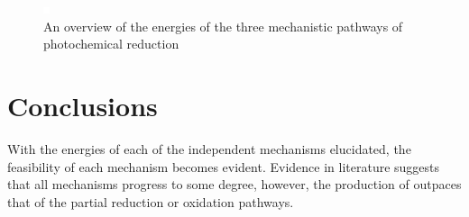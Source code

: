 \begin{figure}[!htbp]
 \begin{center}
  \includegraphics[clip=true]{images/insertgraphic.eps}
 \end{center}
\caption[Reaction energies for three mechanistic pathways]{An overview of the energies of the three mechanistic pathways of photochemical  reduction}
\label{fig.threeenergies}
\end{figure} 

\section{Conclusions} 

With the energies of each of the independent mechanisms elucidated, the feasibility of each mechanism becomes evident. Evidence in literature suggests that all mechanisms progress to some degree, however, the production of  outpaces that of the partial reduction or oxidation pathways. 
